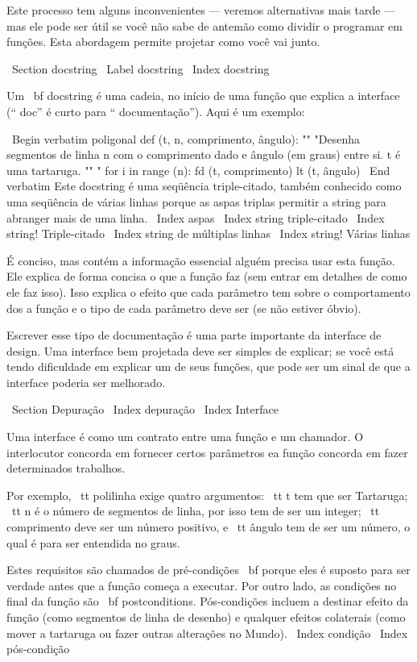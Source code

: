 \documentclass[10pt]{book}
\begin{document}
{Este processo tem alguns inconvenientes --- veremos alternativas mais tarde --- mas
ele pode ser útil se você não sabe de antemão como dividir o
programar em funções. Esta abordagem permite projetar como você vai
junto.


\ Section {} docstring
\ Label {} docstring
\ Index {} docstring

Um {\ bf docstring} é uma cadeia, no início de uma função que
explica a interface (`` doc'' é curto para `` documentação''). Aqui
é um exemplo:

\ Begin {verbatim}
poligonal def (t, n, comprimento, ângulo):
    "" "Desenha segmentos de linha n com o comprimento dado e
    ângulo (em graus) entre si. t é uma tartaruga.
    "" "    
    for i in range (n):
        fd (t, comprimento)
        lt (t, ângulo)
\ End {verbatim}
%
Este docstring é uma seqüência triple-citado, também conhecido
como uma seqüência de várias linhas porque as aspas triplas permitir a string
para abranger mais de uma linha.
\ Index {aspas}
\ Index {string triple-citado}
\ Index {string! Triple-citado}
\ Index {string de múltiplas linhas}
\ Index {string! Várias linhas}

É conciso, mas contém a informação essencial
alguém precisa usar esta função. Ele explica de forma concisa o que
a função faz (sem entrar em detalhes de como ele faz
isso). Isso explica o efeito que cada parâmetro tem sobre o comportamento dos
a função e o tipo de cada parâmetro deve ser (se não estiver
óbvio).

Escrever esse tipo de documentação é uma parte importante da interface de
design. Uma interface bem projetada deve ser simples de explicar;
se você está tendo dificuldade em explicar um de seus funções,
que pode ser um sinal de que a interface poderia ser melhorado.


\ Section {} Depuração
\ Index {depuração}
\ Index {Interface}

Uma interface é como um contrato entre uma função e um chamador.
O interlocutor concorda em fornecer certos parâmetros ea função
concorda em fazer determinados trabalhos.

Por exemplo, {\ tt polilinha} exige quatro argumentos: {\ tt t} tem que ser
Tartaruga; {\ tt n} é o número de segmentos de linha, por isso tem de ser um
integer; {\ tt comprimento} deve ser um número positivo, e {\ tt
  ângulo} tem de ser um número, o qual é para ser entendida no graus.

Estes requisitos são chamados de pré-condições {\ bf} porque eles
é suposto para ser verdade antes que a função começa a executar.
Por outro lado, as condições no final da função são
{\ bf postconditions}. Pós-condições incluem a destinar
efeito da função (como segmentos de linha de desenho) e qualquer
efeitos colaterais (como mover a tartaruga ou fazer outras alterações
no Mundo).
\ Index {condição}
\ Index {pós-condição}

}
\end{document}
